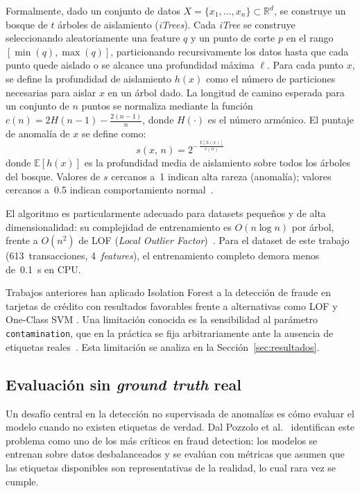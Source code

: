\documentclass[conference]{IEEEtran}
\begin{document}
Formalmente, dado un conjunto de datos $X = \{x_1, \ldots, x_n\} \subset \mathbb{R}^d$,
se construye un bosque de $t$ \'arboles de aislamiento (\emph{iTrees}). Cada
\emph{iTree} se construye seleccionando aleatoriamente una feature $q$ y un punto
de corte $p$ en el rango $[\min(q), \max(q)]$, particionando recursivamente los datos
hasta que cada punto quede aislado o se alcance una profundidad m\'axima $\ell$.
Para cada punto $x$, se define la profundidad de aislamiento $h(x)$ como el n\'umero
de particiones necesarias para aislar $x$ en un \'arbol dado. La longitud de camino
esperada para un conjunto de $n$ puntos se normaliza mediante la funci\'on
$c(n) = 2H(n-1) - \frac{2(n-1)}{n}$, donde $H(\cdot)$ es el n\'umero arm\'onico.
El puntaje de anomal\'ia de $x$ se define como:
\begin{equation}
  s(x,\,n) = 2^{-\,\frac{\mathbb{E}[h(x)]}{c(n)}}
\end{equation}
donde $\mathbb{E}[h(x)]$ es la profundidad media de aislamiento sobre todos los
\'arboles del bosque. Valores de $s$ cercanos a~1 indican alta rareza (anomal\'ia);
valores cercanos a~0.5 indican comportamiento normal~\cite{liu2012isolation}.

El algoritmo es particularmente adecuado para datasets peque\~nos y de alta
dimensionalidad: su complejidad de entrenamiento es $O(n \log n)$ por \'arbol,
frente a $O(n^2)$ de LOF (\emph{Local Outlier Factor})~\cite{liu2008isolation}.
Para el dataset de este trabajo (613~transacciones, 4~\emph{features}), el
entrenamiento completo demora menos de~0.1~s en CPU.

Trabajos anteriores han aplicado Isolation Forest a la detecci\'on de fraude en
tarjetas de cr\'edito con resultados favorables frente a alternativas como LOF y
One-Class SVM \cite{ounacer2018isolation, vijayakumar2020isolation}. Una limitaci\'on
conocida es la sensibilidad al par\'ametro \texttt{contamination}, que en la
pr\'actica se fija arbitrariamente ante la ausencia de etiquetas
reales~\cite{dalpozzolo2018credit}. Esta limitaci\'on se analiza en la
Secci\'on~\ref{sec:resultados}.

\subsection{Evaluaci\'on sin \emph{ground truth} real}

Un desaf\'io central en la detecci\'on no supervisada de anomal\'ias es c\'omo
evaluar el modelo cuando no existen etiquetas de verdad. Dal Pozzolo et
al.~\cite{dalpozzolo2018credit} identifican este problema como uno de los m\'as
cr\'iticos en fraud detection: los modelos se entrenan sobre datos desbalanceados
y se eval\'uan con m\'etricas que asumen que las etiquetas disponibles son
representativas de la realidad, lo cual rara vez se cumple.
\end{document}
